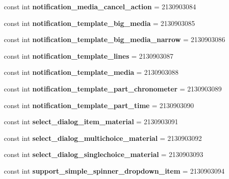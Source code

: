 \begin{DoxyCompactItemize}
\item 
\mbox{\label{classXaria_1_1Resource_1_1Layout_a39a39709b3fb55f897e4dee7dc30150d}} 
const int {\bfseries notification\+\_\+media\+\_\+cancel\+\_\+action} = 2130903084
\item 
\mbox{\label{classXaria_1_1Resource_1_1Layout_a03531d0d2287b610e6eba54ea172aaa4}} 
const int {\bfseries notification\+\_\+template\+\_\+big\+\_\+media} = 2130903085
\item 
\mbox{\label{classXaria_1_1Resource_1_1Layout_aefb2b879f3ec581a1922edd17968f1ed}} 
const int {\bfseries notification\+\_\+template\+\_\+big\+\_\+media\+\_\+narrow} = 2130903086
\item 
\mbox{\label{classXaria_1_1Resource_1_1Layout_af4fddea3e61ec6999a36cdd39ffe29a5}} 
const int {\bfseries notification\+\_\+template\+\_\+lines} = 2130903087
\item 
\mbox{\label{classXaria_1_1Resource_1_1Layout_a9b52fe543ef987849fc42f9632f49045}} 
const int {\bfseries notification\+\_\+template\+\_\+media} = 2130903088
\item 
\mbox{\label{classXaria_1_1Resource_1_1Layout_a88b6726ca46ccdced43b9fa0adc176a2}} 
const int {\bfseries notification\+\_\+template\+\_\+part\+\_\+chronometer} = 2130903089
\item 
\mbox{\label{classXaria_1_1Resource_1_1Layout_a3be35f20448344ddef672e43b1de6a87}} 
const int {\bfseries notification\+\_\+template\+\_\+part\+\_\+time} = 2130903090
\item 
\mbox{\label{classXaria_1_1Resource_1_1Layout_aa5a5a0db1e97e643a149dfbddd02e057}} 
const int {\bfseries select\+\_\+dialog\+\_\+item\+\_\+material} = 2130903091
\item 
\mbox{\label{classXaria_1_1Resource_1_1Layout_a9132b3ebec2710822b86ce339ca291f5}} 
const int {\bfseries select\+\_\+dialog\+\_\+multichoice\+\_\+material} = 2130903092
\item 
\mbox{\label{classXaria_1_1Resource_1_1Layout_a35a8f18ac3ee0bd41c9696c837324f18}} 
const int {\bfseries select\+\_\+dialog\+\_\+singlechoice\+\_\+material} = 2130903093
\item 
\mbox{\label{classXaria_1_1Resource_1_1Layout_a10579e1d016679b7765b0ba0ac078f61}} 
const int {\bfseries support\+\_\+simple\+\_\+spinner\+\_\+dropdown\+\_\+item} = 2130903094
\end{DoxyCompactItemize}


